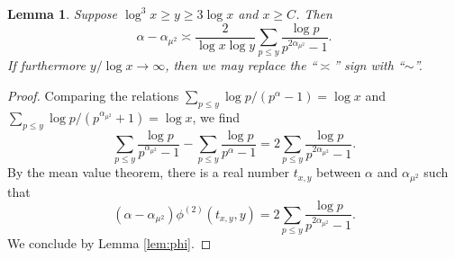 \documentclass[10pt,a4paper]{amsart}
\newtheorem{lem}{Lemma}
\begin{document}
\begin{lem}\label{lem:alphadiff}
	Suppose $\log^3 x \ge y \ge 3\log x$ and $x \ge C$. Then 
	\[\alpha-\alpha_{\mu^2} \asymp \frac{2}{\log x \log y} \sum_{p \le y} \frac{\log p}{p^{2\alpha_{\mu^2}}-1}.\]
	If furthermore $y/\log x \to \infty$, then we may replace the  ``$\asymp$'' sign with ``$\sim$''.
\end{lem}

\begin{proof}
	Comparing the relations $\sum_{p \le y} \log p/(p^{\alpha}-1)=\log x$ and $\sum_{p \le y} \log p/(p^{\alpha_{\mu^2}}+1)=\log x$, we find
	\[\sum_{p \le y} \frac{\log p}{p^{\alpha_{\mu^2}}-1}- \sum_{p \le y} \frac{\log p}{p^{\alpha}-1}  = 2 \sum_{p \le y} \frac{\log p}{p^{2\alpha_{\mu^2}}-1}.\]
	By the mean value theorem, there is a real number $t_{x,y}$ between $\alpha$ and $\alpha_{\mu^2}$ such that
	\[ (\alpha-\alpha_{\mu^2})\phi^{(2)}(t_{x,y},y)  =2 \sum_{p \le y} \frac{\log p}{p^{2\alpha_{\mu^2}}-1}.\]
	We conclude by Lemma \ref{lem:phi}.
\end{proof}
\end{document}
